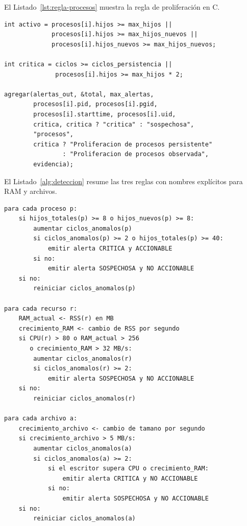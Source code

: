El Listado~\ref{lst:regla-procesos} muestra la regla de proliferación en C.

\begin{lstlisting}[style=codigoC,caption={Clasificación de la proliferación de procesos.},label={lst:regla-procesos}]
int activo = procesos[i].hijos >= max_hijos ||
             procesos[i].hijos >= max_hijos_nuevos ||
             procesos[i].hijos_nuevos >= max_hijos_nuevos;

int critica = ciclos >= ciclos_persistencia ||
              procesos[i].hijos >= max_hijos * 2;

agregar(alertas_out, &total, max_alertas,
        procesos[i].pid, procesos[i].pgid,
        procesos[i].starttime, procesos[i].uid,
        critica, critica ? "critica" : "sospechosa",
        "procesos",
        critica ? "Proliferacion de procesos persistente"
                : "Proliferacion de procesos observada",
        evidencia);
\end{lstlisting}

El Listado~\ref{alg:deteccion} resume las tres reglas con nombres explícitos
para RAM y archivos.

\begin{lstlisting}[style=pseudocodigo,caption={Motor de detección y clasificación.},label={alg:deteccion}]
para cada proceso p:
    si hijos_totales(p) >= 8 o hijos_nuevos(p) >= 8:
        aumentar ciclos_anomalos(p)
        si ciclos_anomalos(p) >= 2 o hijos_totales(p) >= 40:
            emitir alerta CRITICA y ACCIONABLE
        si no:
            emitir alerta SOSPECHOSA y NO ACCIONABLE
    si no:
        reiniciar ciclos_anomalos(p)

para cada recurso r:
    RAM_actual <- RSS(r) en MB
    crecimiento_RAM <- cambio de RSS por segundo
    si CPU(r) > 80 o RAM_actual > 256
       o crecimiento_RAM > 32 MB/s:
        aumentar ciclos_anomalos(r)
        si ciclos_anomalos(r) >= 2:
            emitir alerta SOSPECHOSA y NO ACCIONABLE
    si no:
        reiniciar ciclos_anomalos(r)

para cada archivo a:
    crecimiento_archivo <- cambio de tamano por segundo
    si crecimiento_archivo > 5 MB/s:
        aumentar ciclos_anomalos(a)
        si ciclos_anomalos(a) >= 2:
            si el escritor supera CPU o crecimiento_RAM:
                emitir alerta CRITICA y NO ACCIONABLE
            si no:
                emitir alerta SOSPECHOSA y NO ACCIONABLE
    si no:
        reiniciar ciclos_anomalos(a)
\end{lstlisting}

